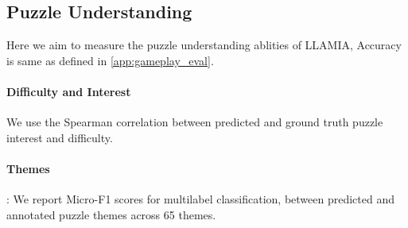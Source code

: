 \begin{table}[!h]
    \caption{\textbf{State Annotation:} Measures the move level explanation capability. The moves are annotated in the categories (1) \textbf{Description} describing the move or position \textbf{Quality} measuring the quality of the move is it a blunder or best move, \textbf{Planning} describing the rationale behind a move, \textbf{Context} contextual info across moves, and \textbf{Comparative} suggesting a better move. Following the benchmark from \cite{jhamtani-etal-2018-learning} we measure the BLEU-2 scores and preplexity following \cite{lee2022improving}. However these methods assume that it is known which move is to be annotated, which creates a bias, for e.g. all LLMs are biased to generate lengthy explanation for moves that could be following a simple opening. Larger LLMs and even smaller finetuned models do very well on description and context, however LLAMIA shows significant improvements of 10\% and upto 50\% in planning and quality over 30x larger. Being trained on puzzle difficulty, interest and game level commentary LLAMIA exhibits significant improvement in annotation relevance as well.}
    \label{tab:state_commentary_annotation}
    \end{table}

\subsection{Puzzle Understanding}
Here we aim to measure the puzzle understanding ablities of LLAMIA, Accuracy is same as defined in \cref{app:gameplay_eval}. 

\paragraph{Difficulty and Interest} We use the Spearman correlation between predicted and ground truth puzzle interest and difficulty.

\paragraph{Themes}: We report Micro-F1 scores for multilabel classification, between predicted and annotated puzzle themes across 65 themes.


